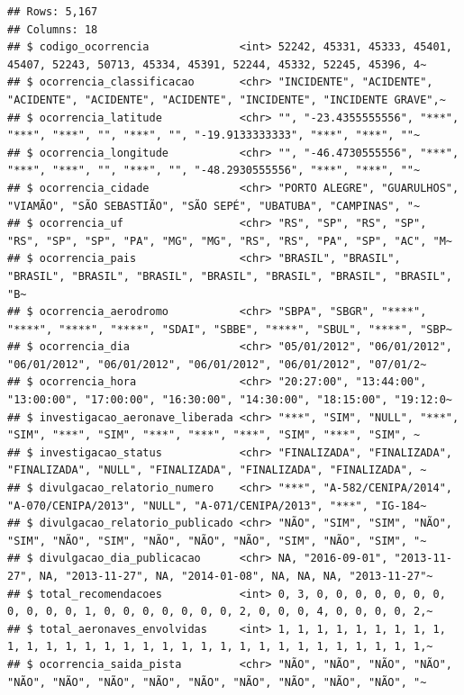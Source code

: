 \documentclass[
]{article}
\begin{document}
\begin{verbatim}
## Rows: 5,167
## Columns: 18
## $ codigo_ocorrencia              <int> 52242, 45331, 45333, 45401, 45407, 52243, 50713, 45334, 45391, 52244, 45332, 52245, 45396, 4~
## $ ocorrencia_classificacao       <chr> "INCIDENTE", "ACIDENTE", "ACIDENTE", "ACIDENTE", "ACIDENTE", "INCIDENTE", "INCIDENTE GRAVE",~
## $ ocorrencia_latitude            <chr> "", "-23.4355555556", "***", "***", "***", "", "***", "", "-19.9133333333", "***", "***", ""~
## $ ocorrencia_longitude           <chr> "", "-46.4730555556", "***", "***", "***", "", "***", "", "-48.2930555556", "***", "***", ""~
## $ ocorrencia_cidade              <chr> "PORTO ALEGRE", "GUARULHOS", "VIAMÃO", "SÃO SEBASTIÃO", "SÃO SEPÉ", "UBATUBA", "CAMPINAS", "~
## $ ocorrencia_uf                  <chr> "RS", "SP", "RS", "SP", "RS", "SP", "SP", "PA", "MG", "MG", "RS", "RS", "PA", "SP", "AC", "M~
## $ ocorrencia_pais                <chr> "BRASIL", "BRASIL", "BRASIL", "BRASIL", "BRASIL", "BRASIL", "BRASIL", "BRASIL", "BRASIL", "B~
## $ ocorrencia_aerodromo           <chr> "SBPA", "SBGR", "****", "****", "****", "****", "SDAI", "SBBE", "****", "SBUL", "****", "SBP~
## $ ocorrencia_dia                 <chr> "05/01/2012", "06/01/2012", "06/01/2012", "06/01/2012", "06/01/2012", "06/01/2012", "07/01/2~
## $ ocorrencia_hora                <chr> "20:27:00", "13:44:00", "13:00:00", "17:00:00", "16:30:00", "14:30:00", "18:15:00", "19:12:0~
## $ investigacao_aeronave_liberada <chr> "***", "SIM", "NULL", "***", "SIM", "***", "SIM", "***", "***", "***", "SIM", "***", "SIM", ~
## $ investigacao_status            <chr> "FINALIZADA", "FINALIZADA", "FINALIZADA", "NULL", "FINALIZADA", "FINALIZADA", "FINALIZADA", ~
## $ divulgacao_relatorio_numero    <chr> "***", "A-582/CENIPA/2014", "A-070/CENIPA/2013", "NULL", "A-071/CENIPA/2013", "***", "IG-184~
## $ divulgacao_relatorio_publicado <chr> "NÃO", "SIM", "SIM", "NÃO", "SIM", "NÃO", "SIM", "NÃO", "NÃO", "NÃO", "SIM", "NÃO", "SIM", "~
## $ divulgacao_dia_publicacao      <chr> NA, "2016-09-01", "2013-11-27", NA, "2013-11-27", NA, "2014-01-08", NA, NA, NA, "2013-11-27"~
## $ total_recomendacoes            <int> 0, 3, 0, 0, 0, 0, 0, 0, 0, 0, 0, 0, 0, 1, 0, 0, 0, 0, 0, 0, 0, 2, 0, 0, 0, 4, 0, 0, 0, 0, 2,~
## $ total_aeronaves_envolvidas     <int> 1, 1, 1, 1, 1, 1, 1, 1, 1, 1, 1, 1, 1, 1, 1, 1, 1, 1, 1, 1, 1, 1, 1, 1, 1, 1, 1, 1, 1, 1, 1,~
## $ ocorrencia_saida_pista         <chr> "NÃO", "NÃO", "NÃO", "NÃO", "NÃO", "NÃO", "NÃO", "NÃO", "NÃO", "NÃO", "NÃO", "NÃO", "NÃO", "~
\end{verbatim}
\end{document}
